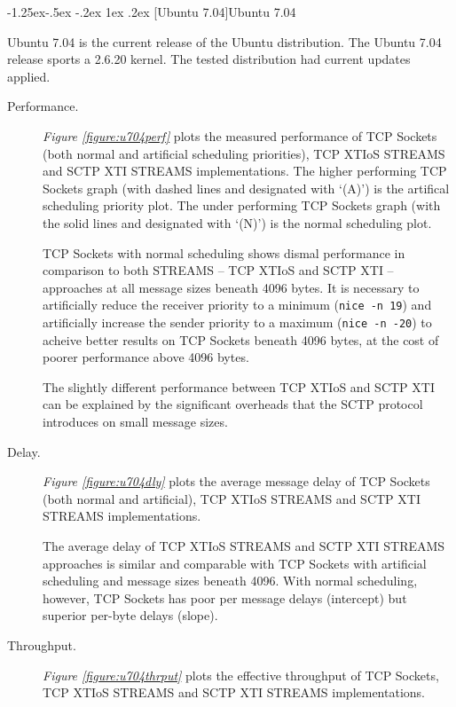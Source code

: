 \documentclass[letterpaper,final,notitlepage,twocolumn,10pt,twoside]{article}
\makeatletter
\renewcommand\subsubsection{\@startsection{subsubsection}{3}{\z@}%
                                     {-1.25ex\@plus -.5ex \@minus -.2ex}%
                                     {1ex \@plus .2ex}%
                                     {\normalfont\normalsize\bfseries}}
\makeatother
\begin{document}
\subsubsection[Ubuntu 7.04]{Ubuntu 7.04}

Ubuntu 7.04 is the current release of the Ubuntu distribution.  The Ubuntu 7.04 release sports a
2.6.20 kernel.  The tested distribution had current updates applied.

\begin{description}

\item[Performance.]

\textit{Figure \ref{figure:u704perf}}
plots the measured performance of TCP Sockets (both normal and artificial scheduling priorities),
TCP XTIoS STREAMS and SCTP XTI STREAMS implementations.
The higher performing TCP Sockets graph (with dashed lines and designated with `(A)') is the
artifical scheduling priority plot.  The under performing TCP Sockets graph (with the solid lines
and designated with `(N)') is the normal scheduling plot.

TCP Sockets with normal scheduling shows dismal performance in comparison to both STREAMS -- TCP
XTIoS and SCTP XTI -- approaches at all message sizes beneath 4096 bytes.  It is necessary to
artificially reduce the receiver priority to a minimum (\texttt{nice -n 19}) and artificially
increase the sender priority to a maximum (\texttt{nice -n -20}) to acheive better results on TCP
Sockets beneath 4096 bytes, at the cost of poorer performance above 4096 bytes.

The slightly different performance between TCP XTIoS and SCTP XTI can be explained by the
significant overheads that the SCTP protocol introduces on small message sizes.

\item[Delay.]

\textit{Figure \ref{figure:u704dly}}
plots the average message delay of TCP Sockets (both normal and artificial), TCP XTIoS STREAMS and
SCTP XTI STREAMS implementations.

The average delay of TCP XTIoS STREAMS and SCTP XTI STREAMS approaches is similar and comparable
with TCP Sockets with artificial scheduling and message sizes beneath 4096.  With normal scheduling,
however, TCP Sockets has poor per message delays (intercept) but superior per-byte delays (slope).

\item[Throughput.]

\textit{Figure \ref{figure:u704thrput}}
plots the effective throughput of TCP Sockets, TCP XTIoS STREAMS and SCTP XTI STREAMS
implementations.


\end{description}
\end{document}
